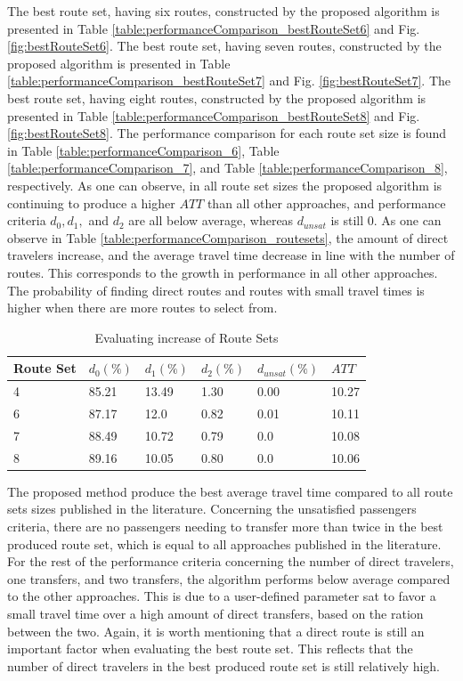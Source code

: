 The best route set, having six routes, constructed by the proposed algorithm is presented in Table \vref{table:performanceComparison_bestRouteSet6} and Fig. \vref{fig:bestRouteSet6}. The best route set, having seven routes, constructed by the proposed algorithm is presented in Table \vref{table:performanceComparison_bestRouteSet7} and Fig. \vref{fig:bestRouteSet7}. The best route set, having eight routes, constructed by the proposed algorithm is presented in Table \vref{table:performanceComparison_bestRouteSet8} and Fig. \vref{fig:bestRouteSet8}. The performance comparison for each route set size is found in Table \vref{table:performanceComparison_6}, Table \vref{table:performanceComparison_7}, and Table \vref{table:performanceComparison_8}, respectively. As one can observe, in all route set sizes the proposed algorithm is continuing to produce a higher $ATT$ than all other approaches, and performance criteria $d_0, d_1,$ and $d_{2}$ are all below average, whereas $d_{unsat}$ is still 0. As one can observe in Table \vref{table:performanceComparison_routesets}, the amount of direct travelers increase, and the average travel time decrease in line with the number of routes. This corresponds to the growth in performance in all other approaches. The probability of finding direct routes and routes with small travel times is higher when there are more routes to select from. 

 \begin{table}[H]
    \centering
    \begin{tabular}{|l||l|l|l|l|l|}
    \hline
    Route Set & $d_0(\%)$ & $d_1(\%)$ & $d_2(\%)$ & $d_{unsat}(\%)$ & $ATT$ \\
    \hline
    4 & 85.21 & 13.49 & 1.30 & 0.00 & 10.27\\
    6 & 87.17 & 12.0 & 0.82 & 0.01 & 10.11\\
    7 & 88.49 & 10.72 & 0.79 & 0.0 & 10.08\\
    8 & 89.16 & 10.05 & 0.80 & 0.0 & 10.06\\
    \hline
    \end{tabular}
    \caption {Evaluating increase of Route Sets}
    \label{table:performanceComparison_routesets}
\end{table}


The proposed method produce the best average travel time compared to all route sets sizes published in the literature. Concerning the unsatisfied passengers criteria, there are no passengers needing to transfer more than twice in the best produced route set, which is equal to all approaches published in the literature. For the rest of the performance criteria concerning the number of direct travelers, one transfers, and two transfers, the algorithm performs below average compared to the other approaches. This is due to a user-defined parameter sat to favor a small travel time over a high amount of direct transfers, based on the ration between the two. Again, it is worth mentioning that a direct route is still an important factor when evaluating the best route set. This reflects that the number of direct travelers in the best produced route set is still relatively high.

